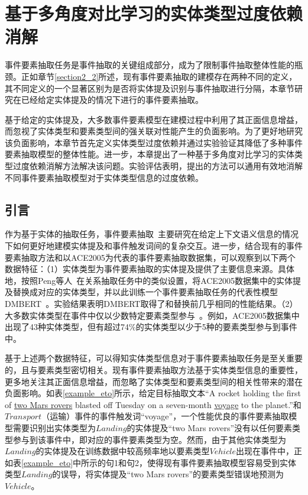 \chapter{基于多角度对比学习的实体类型过度依赖消解}
\label{chap:chapter4}

事件要素抽取任务是事件抽取的关键组成部分，成为了限制事件抽取整体性能的瓶颈。正如章节\ref{section2_2}所述，现有事件要素抽取的建模存在两种不同的定义，其不同定义的一个显著区别为是否将实体提及识别与事件抽取进行分隔，本章节研究在已经给定实体提及的情况下进行的事件要素抽取。

基于给定的实体提及，大多数事件要素模型在建模过程中利用了其正面信息增益，而忽视了实体类型和要素类型间的强关联对性能产生的负面影响。为了更好地研究该负面影响，本章节首先定义实体类型过度依赖并通过实验验证其降低了多种事件要素抽取模型的整体性能。进一步，本章提出了一种基于多角度对比学习的实体类型过度依赖消解方法解决该问题。实验评估表明，提出的方法可以通用有效地消解不同事件要素抽取模型对于实体类型信息的过度依赖。


\section{引言}

作为基于实体的抽取任务，事件要素抽取~\cite{chen2015event,wang2019hmeae,xiangyu2021capturing}主要研究在给定上下文语义信息的情况下如何更好地建模实体提及和事件触发词间的复杂交互。进一步，结合现有的事件要素抽取方法和以ACE2005为代表的事件要素抽取数据集，可以观察到以下两个数据特征：（1）实体类型为事件要素抽取的实体提及提供了主要信息来源。具体地，按照Peng等人~\cite{peng2020learning}在关系抽取任务中的类似设置，将ACE2005数据集中的实体提及替换成对应的实体类型，并以此训练一个事件要素抽取任务的代表性模型DMBERT~\cite{wang2019adversarial}。实验结果表明DMBERT取得了和替换前几乎相同的性能结果。（2）大多数实体类型在事件中仅以少数特定要素类型参与~\cite{hong2011using}。例如，ACE2005数据集中出现了43种实体类型，但有超过74\%的实体类型以少于5种的要素类型参与到事件中。

基于上述两个数据特征，可以得知实体类型信息对于事件要素抽取任务是至关重要的，且与要素类型密切相关。现有事件要素抽取方法基于实体类型信息的重要性，更多地关注其正面信息增益，而忽略了实体类型和要素类型间的相关性带来的潜在负面影响。如表\ref{example_eto}所示，给定目标抽取文本“A rocket holding the first of \underline{two Mars rovers} blasted off Tuesday on a seven-month \underline{voyage} to the planet.”和$Transport$（运输）事件的事件触发词“voyage”，一个性能优良的事件要素抽取模型需要识别出实体类型为$Landing$的实体提及“two Mars rovers”没有以任何要素类型参与到该事件中，即对应的事件要素类型为空。然而，由于其他实体类型为$Landing$的实体提及在训练数据中较高频率地以要素类型$Vehicle$出现在事件中，正如表\ref{example_eto}中所示的句1和句2，使得现有事件要素抽取模型容易受到实体类型$Landing$的误导，将实体提及“two Mars rovers”的要素类型错误地预测为$Vehicle$。

